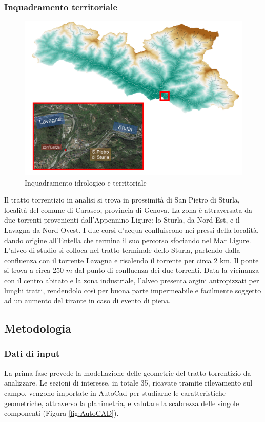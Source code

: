 \documentclass[12pt]{article} %
\begin{document}
\subsubsection{Inquadramento territoriale}

\begin{figure}[H]
    \centering
    \includegraphics[scale=0.6]{BacinoLavagna.png}
    \caption{Inquadramento idrologico e territoriale}
\end{figure}

\noindent Il tratto torrentizio in analisi si trova in prossimità di San Pietro di Sturla, località del comune di Carasco, provincia di Genova. La zona è attraversata da due torrenti provenienti dall’Appennino Ligure: lo Sturla, da Nord-Est, e il Lavagna da Nord-Ovest. I due corsi d’acqua confluiscono nei pressi della località, dando origine all’Entella che termina il suo percorso sfociando nel Mar Ligure. L’alveo di studio si colloca nel tratto terminale dello Sturla, partendo dalla confluenza con il torrente Lavagna e risalendo il torrente per circa 2 km. Il ponte si trova a circa 250 $m$ dal punto di confluenza dei due torrenti. Data la vicinanza con il centro abitato e la zona industriale, l’alveo presenta argini antropizzati per lunghi tratti, rendendolo così per buona parte impermeabile e facilmente soggetto ad un aumento del tirante in caso di evento di piena.

\subsection{Metodologia}

\subsubsection{Dati di input}
\noindent La prima fase prevede la modellazione delle geometrie del tratto torrentizio da analizzare. Le sezioni di interesse, in totale 35, ricavate tramite rilevamento sul campo, vengono importate in AutoCad per studiarne le caratteristiche geometriche, attraverso la planimetria, e valutare la scabrezza delle singole componenti (Figura \ref{fig:AutoCAD}). 
\end{document}
